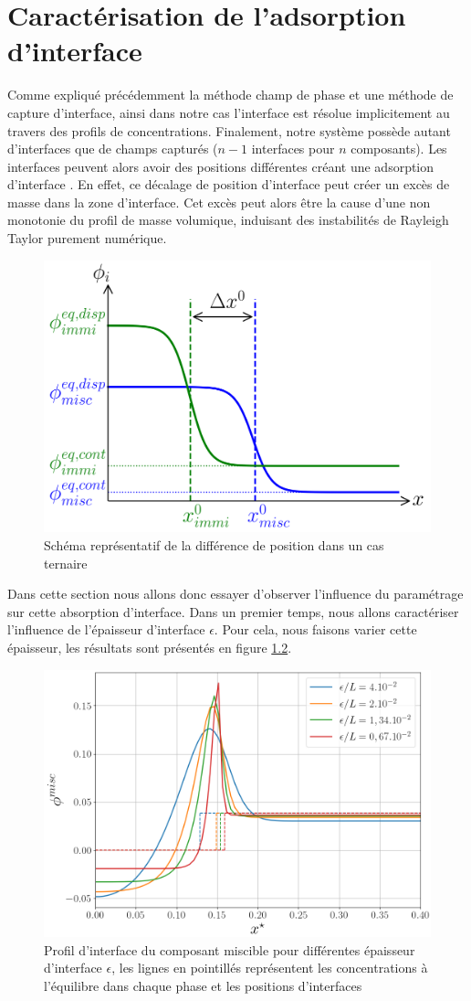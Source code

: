 \chapter{Caractérisation de l'adsorption d'interface} \label{absorption}
Comme expliqué précédemment la méthode champ de phase et une méthode de capture d'interface, ainsi dans notre cas l'interface est résolue implicitement au travers des profils de concentrations. Finalement, notre système possède autant d'interfaces que de champs capturés ($n-1$ interfaces pour $n$ composants). Les interfaces peuvent alors avoir des positions différentes créant une adsorption d'interface \cite{rasolofomanana_diffuse-interface_2022}. En effet, ce décalage de position d'interface peut créer un excès de masse dans la zone d'interface. Cet excès peut alors être la cause d'une non monotonie du profil de masse volumique, induisant des instabilités de Rayleigh Taylor purement numérique.
\begin{figure}[H]
	\centering
	\includegraphics[width=0.5\linewidth]{figure/fig_absorption}
	\caption{Schéma représentatif de la différence de position dans un cas ternaire}
	\label{fig:figabsorption}
\end{figure}
Dans cette section nous allons donc essayer d'observer l'influence du paramétrage sur cette absorption d'interface. Dans un premier temps, nous allons caractériser l'influence de l'épaisseur d'interface $\epsilon$. Pour cela, nous faisons varier cette épaisseur, les résultats sont présentés en figure \ref{fig:planeimmiscible}.
\begin{figure}[H]
	\centering
	\includegraphics[width=0.6\linewidth]{figure/plane_immiscible}
	\caption{Profil d'interface du composant miscible pour différentes épaisseur d'interface $\epsilon$, les lignes en pointillés représentent les concentrations à l'équilibre dans chaque phase et les positions d'interfaces}
	\label{fig:planeimmiscible}
\end{figure}
